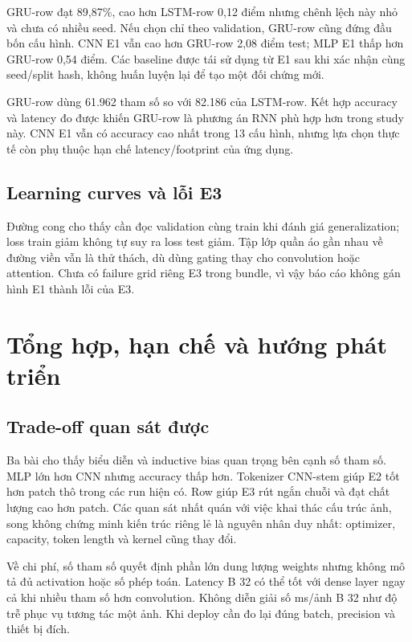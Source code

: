 \documentclass[11pt,a4paper]{article}
\begin{document}
GRU-row đạt 89,87\%, cao hơn LSTM-row 0,12 điểm nhưng chênh lệch này nhỏ và chưa có nhiều seed. Nếu chọn chỉ theo validation, GRU-row cũng đứng đầu bốn cấu hình. CNN E1 vẫn cao hơn GRU-row 2,08 điểm test; MLP E1 thấp hơn GRU-row 0,54 điểm. Các baseline được tái sử dụng từ E1 sau khi xác nhận cùng seed/split hash, không huấn luyện lại để tạo một đối chứng mới.

GRU-row dùng 61.962 tham số so với 82.186 của LSTM-row. Kết hợp accuracy và latency đo được khiến GRU-row là phương án RNN phù hợp hơn trong study này. CNN E1 vẫn có accuracy cao nhất trong 13 cấu hình, nhưng lựa chọn thực tế còn phụ thuộc hạn chế latency/footprint của ứng dụng.
\clearpage

\subsection{Learning curves và lỗi E3}
Đường cong cho thấy cần đọc validation cùng train khi đánh giá generalization; loss train giảm không tự suy ra loss test giảm. Tập lớp quần áo gần nhau về đường viền vẫn là thử thách, dù dùng gating thay cho convolution hoặc attention. Chưa có failure grid riêng E3 trong bundle, vì vậy báo cáo không gán hình E1 thành lỗi của E3.
\clearpage

\section{Tổng hợp, hạn chế và hướng phát triển}\label{sec:discussion}
\subsection{Trade-off quan sát được}
Ba bài cho thấy biểu diễn và inductive bias quan trọng bên cạnh số tham số. MLP lớn hơn CNN nhưng accuracy thấp hơn. Tokenizer CNN-stem giúp E2 tốt hơn patch thô trong các run hiện có. Row giúp E3 rút ngắn chuỗi và đạt chất lượng cao hơn patch. Các quan sát nhất quán với việc khai thác cấu trúc ảnh, song không chứng minh kiến trúc riêng lẻ là nguyên nhân duy nhất: optimizer, capacity, token length và kernel cũng thay đổi.

Về chi phí, số tham số quyết định phần lớn dung lượng weights nhưng không mô tả đủ activation hoặc số phép toán. Latency B 32 có thể tốt với dense layer ngay cả khi nhiều tham số hơn convolution. Không diễn giải số ms/ảnh B 32 như độ trễ phục vụ tương tác một ảnh. Khi deploy cần đo lại đúng batch, precision và thiết bị đích.
\end{document}

